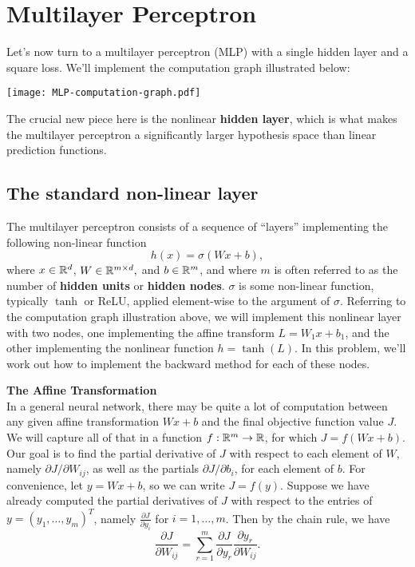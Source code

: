 \documentclass{article}
\newcommand{\nyuparagraph}[1]{\vspace{0.3cm}\textcolor{nyupurple}{\bf \large #1}\\}
\theoremstyle{plain}
\theoremstyle{definition}
\begin{document}
\section{Multilayer Perceptron}

Let's now turn to a multilayer perceptron (MLP)
with a single hidden layer and a square loss. We'll implement the
computation graph illustrated below:
\begin{center}
\texttt{[image: MLP-computation-graph.pdf]}
\par\end{center}

The crucial new piece here is the nonlinear \textbf{hidden layer},
which is what makes the multilayer perceptron a significantly larger
hypothesis space than linear prediction functions.

\subsection{The standard non-linear layer}

The multilayer perceptron consists of a sequence of ``layers'' implementing
the following non-linear function
\[
h(x)=\sigma\left(Wx+b\right),
\]
where $x\in\mathbb{R}^{d}$, $W\in\mathbb{R}^{m\times d},$ and $b\in\mathbb{R}^{m}$,
and where $m$ is often referred to as the number of\textbf{ hidden
units }or\textbf{ hidden nodes}. $\sigma$ is some non-linear function,
typically $\tanh$ or ReLU, applied element-wise to the argument of
$\sigma$. Referring to the computation graph illustration above,
we will implement this nonlinear layer with two nodes, one implementing
the affine transform $L=W_{1}x+b_{1}$, and the other implementing
the nonlinear function $h=\tanh(L)$. In this problem, we'll work
out how to implement the backward method for each of these nodes.

\nyuparagraph{The Affine Transformation}

In a general neural network, there may be quite a lot of computation
between any given affine transformation $Wx+b$ and the final objective
function value $J$. We will capture all of that in a function $f:\mathbb{R}^{m}\to\mathbb{R}$,
for which $J=f(Wx+b)$. Our goal is to find the partial derivative
of $J$ with respect to each element of $W$, namely $\partial J/\partial W_{ij}$,
as well as the partials $\partial J/\partial b_{i}$, for each element
of $b$. For convenience, let $y=Wx+b$, so we can write $J=f(y)$.
Suppose we have already computed the partial derivatives of $J$ with
respect to the entries of $y=\left(y_{1},\ldots,y_{m}\right)^{T}$,
namely $\frac{\partial J}{\partial y_{i}}$ for $i=1,\ldots,m$. Then
by the chain rule, we have
\[
\frac{\partial J}{\partial W_{ij}}=\sum_{r=1}^{m}\frac{\partial J}{\partial y_{r}}\frac{\partial y_{r}}{\partial W_{ij}}.
\]
\end{document}
